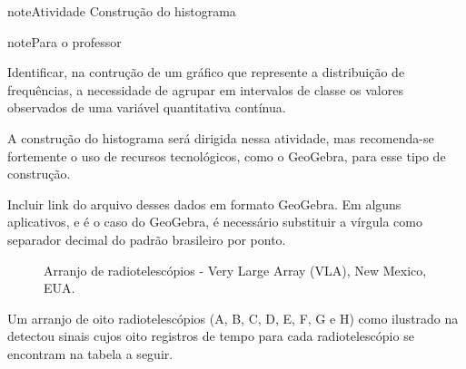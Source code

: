 \label{\detokenize{PE103-3:explorando-visualizando-estruturas-de-variaveis-quantitativas}}\label{\detokenize{PE103-3::doc}}\label{\detokenize{PE103-3:ativ-construcao-histograma}}
\begin{sphinxadmonition}{note}{Atividade}{ Construção do histograma}

\begin{sphinxadmonition}{note}{Para o professor}


Identificar, na contrução de um gráfico que represente a distribuição de frequências, a necessidade de agrupar em intervalos de classe os valores observados de uma variável quantitativa contínua.


A construção do histograma será dirigida nessa atividade, mas  recomenda-se fortemente o uso de recursos tecnológicos, como  o GeoGebra, para esse tipo de construção.

Incluir link do arquivo desses dados em formato GeoGebra. Em alguns aplicativos, e é o caso do GeoGebra, é necessário substituir a vírgula como separador decimal do padrão brasileiro por ponto.
\end{sphinxadmonition}

\begin{figure}[H]
\centering
\capstart

\noindent{}
\caption{Arranjo de radiotelescópios - Very Large Array (VLA), New Mexico, EUA. }\label{\detokenize{PE103-3:fig-radiotelescopios}}\label{\detokenize{PE103-3:id1}}\end{figure}

Um arranjo de oito radiotelescópios (A, B, C, D, E, F, G e H) como  ilustrado na {\hyperref[\detokenize{PE103-3:fig-radiotelescopios}]{}} detectou sinais cujos oito registros de tempo para cada radiotelescópio se encontram na tabela a seguir.



\end{sphinxadmonition}
